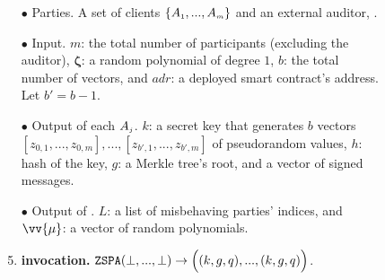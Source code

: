 



\begin{figure}[ht]%
\setlength{\fboxsep}{1pt}
\begin{center}
    \begin{tcolorbox}[enhanced,width=5.5in, 
    drop fuzzy shadow southwest,
    colframe=black,colback=white]


{\small{

\begin{enumerate}


\item[$\bullet$]    {Parties.} A set of clients $\{ A_{\scriptscriptstyle 1},...,  A_{\scriptscriptstyle m}\}$ and an external auditor, \aud. 

\item[$\bullet$]    {Input.}  $m$: the total number of participants (excluding the auditor), $\bm\zeta$: a random polynomial of degree $1$, $b$: the total number of vectors, and $adr$: a deployed smart contract's address. Let $b'=b-1$.







\item[$\bullet$]  {Output of  each} $  A_{\scriptscriptstyle j}$.   $k$: a secret key that generates $b$ vectors $[z_{\scriptscriptstyle 0,1},...,z_{\scriptscriptstyle 0,m}],...,[z_{\scriptscriptstyle b',1},...,z_{\scriptscriptstyle b', m}]$ of pseudorandom values, $h$: hash of the key,  $g$: a Merkle tree's root, and a vector of signed messages. 



\item[$\bullet$]    {Output of \aud.} $L$: a list of misbehaving parties' indices, and  $\vv{{\mu}}$: a vector of random polynomials.
%
\item\label{ZSPA::ZSPA-invocation} {\textbf{\zspa invocation.}  $\mathtt{ZSPA}(\bot,..., \bot)\rightarrow \Big((k, g, q),..., (k, g,q )\Big)$}. 


\end{enumerate}}}
\end{tcolorbox}
\end{center}
\end{figure}
